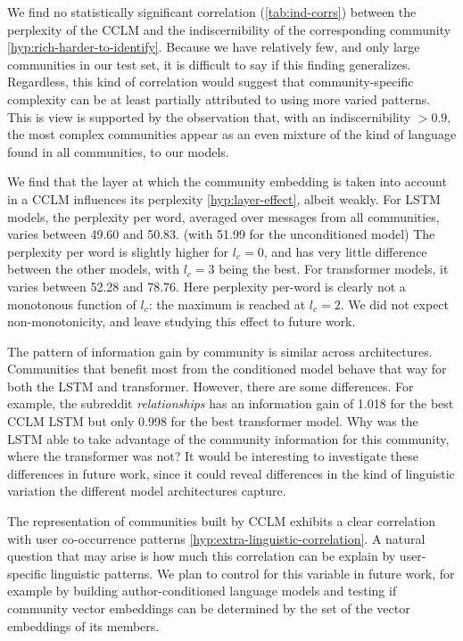 \documentclass[11pt]{article}
\begin{document}
We find no statistically significant correlation (\cref{tab:ind-corrs}) between the
perplexity of the
CCLM and the indiscernibility of the corresponding community
\ref{hyp:rich-harder-to-identify}. Because we have relatively few, and
only large communities in our test set, it is difficult to say if this
finding generalizes. Regardless, this kind of correlation would suggest that
community-specific complexity can be at least partially attributed to
using more varied patterns. This is view is supported by the
observation that, with an indiscernibility $> 0.9$, the most complex
communities appear as an even mixture of the kind of language found in
all communities, to our models.

We find that the layer at which the community embedding is taken into
account in a CCLM influences its perplexity \ref{hyp:layer-effect},
albeit weakly. For LSTM models, the perplexity per word, averaged over
messages from all communities, varies between \num{49.60} and \num{50.83}. (with \num{51.99} for the
unconditioned model) The perplexity per word is slightly higher for
$l_c=0$, and has very little difference between the other models, with
$l_c=3$ being the best.  For transformer models, it varies between 
\num{52.28} and \num{78.76}. Here perplexity per-word is clearly not a monotonous
function of $l_c$: the maximum is reached at $l_c=2$. We did not
expect non-monotonicity, and leave studying this effect to future
work.

The pattern of information gain by community is similar across
architectures.  Communities that benefit most from the conditioned
model behave that way for both the LSTM and transformer.  However,
there are some differences.  For example, the subreddit
\emph{relationships} has an information gain of \num{1.018} for the
best CCLM LSTM but only \num{0.998} for the best transformer model.
Why was the LSTM able to take advantage of the community information
for this community, where the transformer was not?  It would be
interesting to investigate these differences in future work, since it
could reveal differences in the kind of linguistic variation the
different model architectures capture.

The representation of communities built by CCLM exhibits a clear
correlation with user co-occurrence patterns
\ref{hyp:extra-linguistic-correlation}. A natural
question that may arise is how much this correlation can be explain by
user-specific linguistic patterns. We plan to control for this variable
in future work, for example by building author-conditioned language
models and testing if community vector embeddings can be determined by
the set of the vector embeddings of its members.



\end{document}

